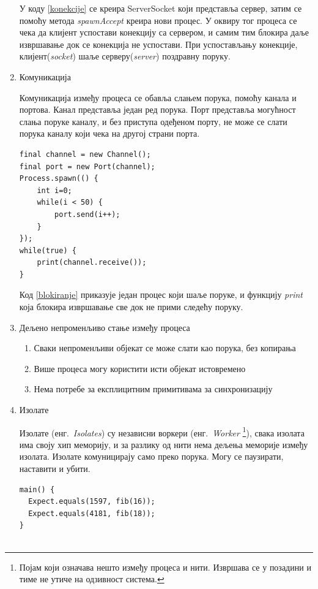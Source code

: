 \documentclass[12pt,oneside]{memoir}
\begin{document}
\begin{enumerate}
У коду \ref{konekcije} се креира ServerSocket који представља сервер, затим се помоћу метода \textit{spawnAccept} креира нови процес. У оквиру тог процеса се чека да клијент успостави конекцију са сервером, и самим тим блокира даље извршавање док се конекција не успостави. При успостављању конекције, клијент(\textit{socket}) шаље серверу(\textit{server}) поздравну поруку.

\item Комуникација

Комуникација између процеса се обавља слањем порука, помоћу канала и портова. Канал представља један ред порука. Порт представља могућност слања поруке каналу, и без приступа одеђеном порту, не може се слати порука каналу који чека на другој страни порта.

\begin{verbatim}
final channel = new Channel();
final port = new Port(channel);
Process.spawn(() {
	int i=0;
	while(i < 50) {
		port.send(i++);
	}
});
while(true) {
	print(channel.receive());
}
\end{verbatim}
Код \ref{blokiranje} приказује један процес који шаље поруке, и функцију \textit{print} која блокира извршавање све док не прими следећу поруку.

\item Дељено непроменљиво стање између процеса
\begin{enumerate}
\item Сваки непроменљиви објекат се може слати као порука, без копирања
\item Више процеса могу користити исти објекат истовремено
\item Нема потребе за експлицитним примитивама за синхронизацију
\end{enumerate}

\item Изолате

Изолате (енг.~\textit{Isolates}) су независни воркери (енг.~\textit{Worker} \footnote{Појам који означава нешто између процеса и нити. Извршава се у позадини и тиме не утиче на одзивност система. }), свака изолата има своју хип меморију, и за разлику од нити нема дељења меморије између изолата. Изолате комуницирају само преко порука. Могу се паузирати, наставити и убити.

\begin{verbatim}
main() {
  Expect.equals(1597, fib(16));
  Expect.equals(4181, fib(18)); 
}


\end{verbatim}
\end{enumerate}
\end{document}
